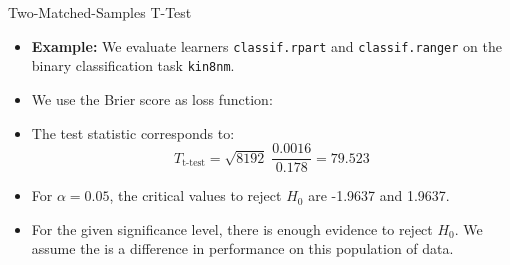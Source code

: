 \documentclass[11pt,compress,t,notes=noshow, aspectratio=169, xcolor=table]{beamer}
\begin{document}

\begin{frame}{Two-Matched-Samples T-Test}
\begin{itemize}
    \item \textbf{Example:} We evaluate learners \texttt{classif.rpart} and \texttt{classif.ranger} on the binary classification task \texttt{kin8nm}.
    \item We use the Brier score as loss function:
    {
        \scriptsize
        
    }
    \item The test statistic corresponds to:
    $$
    T_{\text{t-test}} = \sqrt{8192} \; \frac{0.0016}{0.178} = 79.523
    $$
    \item For $\alpha = 0.05$, the critical values to reject $H_0$ are -1.9637 and 1.9637.
    \item For the given significance level, there is enough evidence to reject $H_0$. We assume the is a difference in performance on this population of data.
\end{itemize}

\end{frame}
\end{document}
